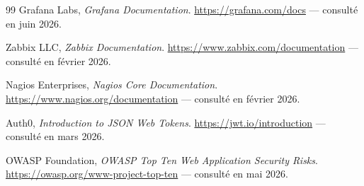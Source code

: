 \begin{thebibliography}{99}
Grafana Labs, \textit{Grafana Documentation}.
\url{https://grafana.com/docs} --- consulté en juin 2026.

Zabbix LLC, \textit{Zabbix Documentation}.
\url{https://www.zabbix.com/documentation} --- consulté en février 2026.

Nagios Enterprises, \textit{Nagios Core Documentation}.
\url{https://www.nagios.org/documentation} --- consulté en février 2026.

Auth0, \textit{Introduction to JSON Web Tokens}.
\url{https://jwt.io/introduction} --- consulté en mars 2026.

OWASP Foundation, \textit{OWASP Top Ten Web Application Security Risks}.
\url{https://owasp.org/www-project-top-ten} --- consulté en mai 2026.

\end{thebibliography}
